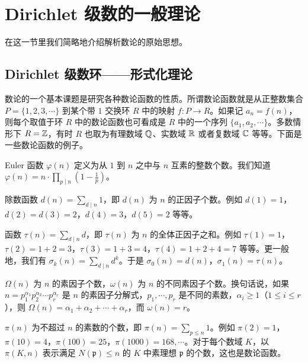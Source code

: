 \section{Dirichlet 级数的一般理论}\label{sec:ch4-s1}

在这一节里我们简略地介绍解析数论的原始思想。

\subsection{Dirichlet 级数环——形式化理论}\label{sec:ch4-s1-1}

数论的一个基本课题是研究各种数论函数的性质。所谓数论函数就是从正整数集合 $P=\{1,2,3,\cdots\}$ 到某个带 $1$ 交换环 $R$ 中的映射 $f\colon P\to R$。如果记 $a_n=f(n)$，则每个取值于环 $R$ 中的数论函数也可看成是 $R$ 中的一个序列 $\{a_1,a_2,\cdots\}$。多数情形下 $R=\mathbb{Z}$，有时 $R$ 也取为有理数域 $\mathbb{Q}$、实数域 $\mathbb{R}$ 或者复数域 $\mathbb{C}$ 等等。下面是一些数论函数的例子。

\begin{example}
Euler 函数 $\varphi(n)$ 定义为从 $1$ 到 $n$ 之中与 $n$ 互素的整数个数。我们知道 $\varphi(n)=n\cdot\prod_{p\mid n}\left(1-\frac{1}{p}\right)$。
\end{example}

\begin{example}
除数函数 $d(n)=\sum_{d\mid n}1$，即 $d(n)$ 为 $n$ 的正因子个数。例如 $d(1)=1$，$d(2)=d(3)=2$，$d(4)=3$，$d(5)=2$ 等等。
\end{example}

\begin{example}
函数 $\tau(n)=\sum_{d\mid n}d$，即 $\tau(n)$ 为 $n$ 的全体正因子之和。例如 $\tau(1)=1$，$\tau(2)=1+2=3$，$\tau(3)=1+3=4$，$\tau(4)=1+2+4=7$ 等等。更一般地，我们有 $\sigma_k(n)=\sum_{d\mid n}d^k$。于是 $\sigma_0(n)=d(n)$，$\sigma_1(n)=\tau(n)$。
\end{example}

\begin{example}
$\Omega(n)$ 为 $n$ 的素因子个数，$\omega(n)$ 为 $n$ 的不同素因子个数。换句话说，如果 $n=p_1^{\alpha_1}p_2^{\alpha_2}\cdots p_r^{\alpha_r}$ 是 $n$ 的素因子分解式，$p_1,\cdots,p_r$ 是不同的素数，$\alpha_i\geqslant 1$（$1\leqslant i\leqslant r$），则 $\Omega(n)=\alpha_1+\alpha_2+\cdots+\alpha_r$，而 $\omega(n)=r$。
\end{example}

\begin{example}
$\pi(n)$ 为不超过 $n$ 的素数的个数，即 $\pi(n)=\sum_{p\leqslant n}1$。例如 $\pi(2)=1$，$\pi(10)=4$，$\pi(100)=25$，$\pi(1000)=168,\cdots$。对于每个数域 $K$，以 $\pi(K,n)$ 表示满足 $N(\mathfrak{p})\leqslant n$ 的 $K$ 中素理想 $\mathfrak{p}$ 的个数，这也是数论函数。
\end{example}

